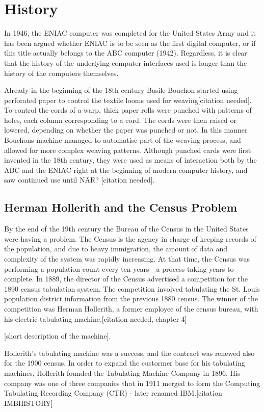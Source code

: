 \section{History}
In 1946, the ENIAC computer was completed for the United States Army and it has been argued whether ENIAC is to be seen as the first digital computer\cite{McCartney1999}, or if this title actually belongs to the ABC computer (1942)\cite{court}. Regardless, it is clear that the history of the underlying computer interfaces used is longer than the history of the computers themselves.

Already in the beginning of the 18th century Basile Bouchon started using perforated paper to control the textile looms used for weaving[citation needed]. To control the cords of a warp, thick paper rolls were punched with patterns of holes, each column corresponding to a cord. The cords were then raised or lowered, depending on whether the paper was punched or not. In this manner Bouchons machine managed to automatise part of the weaving process, and allowed for more complex weaving patterns. Although punched cards were first invented in the 18th century, they were used as means of interaction both by the ABC and the ENIAC right at the beginning of modern computer history, and saw continued use until NÄR? [citation needed].



\subsection{Herman Hollerith and the Census Problem}
By the end of the 19th century the Bureau of the Census in the United States were having a problem. The Census is the agency in charge of keeping records of the population, and due to heavy immigration, the amount of data and complexity of the system was rapidly increasing. At that time, the Census was performing a population count every ten years - a process taking years to complete. In 1889, the director of the Census advertised a competition for the 1890 census tabulation system. The competition involved tabulating the St. Louis population district information from the previous 1880 census. The winner of the competition was Herman Hollerith, a former employee of the census bureau, with his electric tabulating machine.[citation needed, chapter 4]

[short description of the machine].

Hollerith's tabulating machine was a success, and the contract was renewed also for the 1900 census. In order to expand the custormer base for his tabulating machines, Hollerith founded the Tabulating Machine Company in 1896. His company was one of three companies that in 1911 merged to form the Computing Tabulating Recording Company (CTR) - later renamed IBM.[citation IMBHISTORY]

